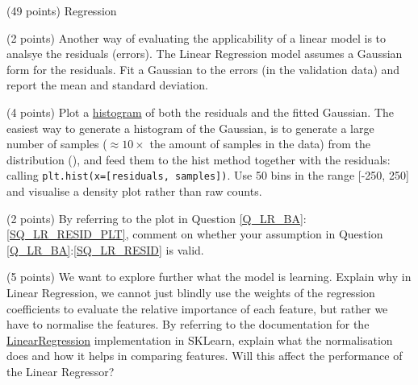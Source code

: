 \documentclass[12pt]{article}
\begin{document}
\begin{question}{\label{Q_LR_BA}(49 points) Regression}
\begin{subquestion}



\end{subquestion}



\begin{subquestion}{\label{SQ_LR_RESID}(2 points) Another way of evaluating the applicability of a linear model is to analsye the residuals (errors). The Linear Regression model assumes a Gaussian form for the residuals. Fit a Gaussian to the errors (in the validation data) and report the mean and standard deviation.}






\end{subquestion}

\begin{subquestion}{\label{SQ_LR_RESID_PLT}(4 points) Plot a \href{https://matplotlib.org/3.1.1/api/_as_gen/matplotlib.pyplot.hist.html}{histogram} of both the residuals and the fitted Gaussian. The easiest way to generate a histogram of the Gaussian, is to generate a large number of samples ($\approx10\times$ the amount of samples in the data) from the distribution (), and feed them to the hist method together with the residuals: \ie calling \texttt{plt.hist(x=[residuals, samples])}. Use 50 bins in the range [-250, 250] and visualise a density plot rather than raw counts.}






\end{subquestion}

\begin{subquestion}{(2 points) By referring to the plot in Question \ref{Q_LR_BA}:\ref{SQ_LR_RESID_PLT}, comment on whether your assumption in Question \ref{Q_LR_BA}:\ref{SQ_LR_RESID} is valid.}






\end{subquestion}



\begin{subquestion}{(5 points) We want to explore further what the model is learning. Explain why in Linear Regression, we cannot just blindly use the weights of the regression coefficients to evaluate the relative importance of each feature, but rather we have to normalise the features. By referring to the documentation for the \href{http://scikit-learn.org/stable/modules/generated/sklearn.linear_model.LinearRegression.html}{LinearRegression} implementation in SKLearn, explain what the normalisation does and how it helps in comparing features. Will this affect the performance of the Linear Regressor?}




\end{subquestion}
\end{question}
\end{document}
